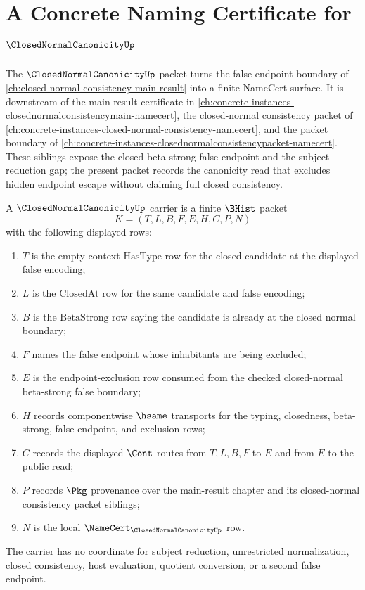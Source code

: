 \chapter{A Concrete Naming Certificate for $\ClosedNormalCanonicityUp$}
\label{ch:concrete-instances-closednormalcanonicity-namecert}

The $\ClosedNormalCanonicityUp$ packet turns the false-endpoint boundary of \autoref{ch:closed-normal-consistency-main-result} into a finite NameCert surface. It is downstream of the main-result certificate in \autoref{ch:concrete-instances-closednormalconsistencymain-namecert}, the closed-normal consistency packet of \autoref{ch:concrete-instances-closed-normal-consistency-namecert}, and the packet boundary of \autoref{ch:concrete-instances-closednormalconsistencypacket-namecert}. These siblings expose the closed beta-strong false endpoint and the subject-reduction gap; the present packet records the canonicity read that excludes hidden endpoint escape without claiming full closed consistency.

\begin{definition}
\label{def:closed-normal-canonicity-carrier}
A $\ClosedNormalCanonicityUp$ carrier is a finite $\BHist$ packet
$$
K=(T,L,B,F,E,H,C,P,N)
$$
with the following displayed rows:
\begin{enumerate}
\item $T$ is the empty-context $\mathrm{HasType}$ row for the closed candidate at the displayed false encoding;
\item $L$ is the $\mathrm{ClosedAt}$ row for the same candidate and false encoding;
\item $B$ is the $\mathrm{BetaStrong}$ row saying the candidate is already at the closed normal boundary;
\item $F$ names the false endpoint whose inhabitants are being excluded;
\item $E$ is the endpoint-exclusion row consumed from the checked closed-normal beta-strong false boundary;
\item $H$ records componentwise $\hsame$ transports for the typing, closedness, beta-strong, false-endpoint, and exclusion rows;
\item $C$ records the displayed $\Cont$ routes from $T,L,B,F$ to $E$ and from $E$ to the public read;
\item $P$ records $\Pkg$ provenance over the main-result chapter and its closed-normal consistency packet siblings;
\item $N$ is the local $\NameCert_{\ClosedNormalCanonicityUp}$ row.
\end{enumerate}
The carrier has no coordinate for subject reduction, unrestricted normalization, closed consistency, host evaluation, quotient conversion, or a second false endpoint.
\end{definition}

